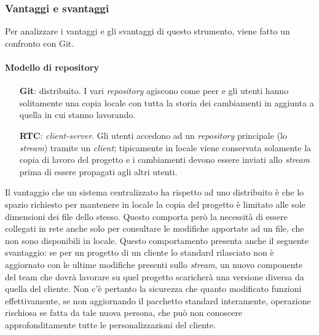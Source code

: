 \subsubsection{Vantaggi e svantaggi}
Per analizzare i vantaggi e gli svantaggi di questo strumento, viene fatto un confronto con Git.
\paragraph*{Modello di repository}
\begin{itemize}
	\item[\textbf{Git}:] distribuito. I vari \textit{repository} agiscono come peer e gli utenti hanno solitamente una copia locale con tutta la storia dei cambiamenti in aggiunta a quella in cui stanno lavorando.
	\item[\textbf{RTC}:] \textit{client-server}. Gli utenti accedono ad un \textit{repository} principale (lo \textit{stream}) tramite un \textit{client}; tipicamente in locale viene conservata solamente la copia di lavoro del progetto e i cambiamenti devono essere inviati allo \textit{stream} prima di essere propagati agli altri utenti.
\end{itemize}
Il vantaggio che un sistema centralizzato ha rispetto ad uno distribuito è che lo spazio richiesto per mantenere in locale la copia del progetto è limitato alle sole dimensioni dei file dello stesso. Questo comporta però la necessità di essere collegati in rete anche solo per consultare le modifiche apportate ad un file, che non sono disponibili in locale. Questo comportamento presenta anche il seguente svantaggio: se per un progetto di un cliente lo standard rilasciato non è aggiornato con le ultime modifiche presenti sullo \textit{stream}, un nuovo componente del team che dovrà lavorare su quel progetto scaricherà una versione diversa da quella del cliente. Non c'è pertanto la sicurezza che quanto modificato funzioni effettivamente, se non aggiornando il pacchetto standard interamente, operazione rischiosa se fatta da tale nuova persona, che può non conoscere approfonditamente tutte le personalizzazioni del cliente.

